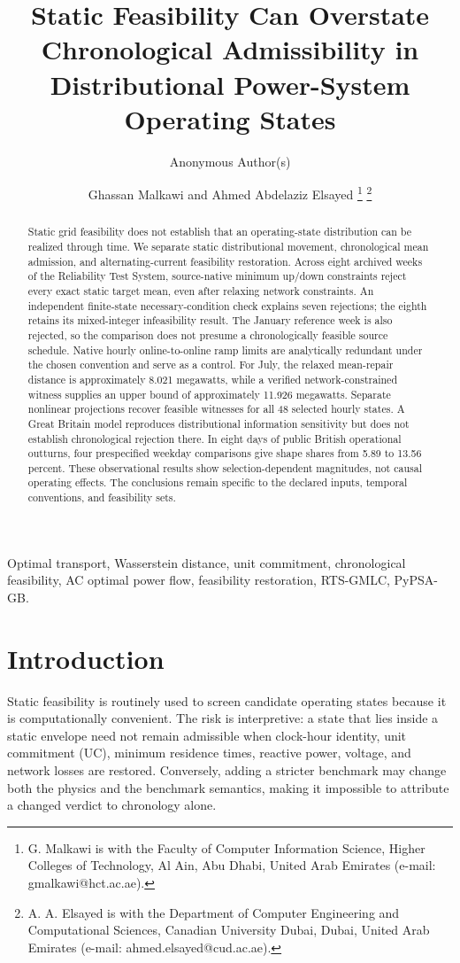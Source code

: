 \documentclass[journal]{IEEEtran}
\title{Static Feasibility Can Overstate Chronological Admissibility in Distributional Power-System Operating States}
\author{Anonymous Author(s)}
\author{Ghassan Malkawi and Ahmed Abdelaziz Elsayed%
\thanks{G. Malkawi is with the Faculty of Computer Information Science, Higher Colleges of Technology, Al Ain, Abu Dhabi, United Arab Emirates (e-mail: gmalkawi@hct.ac.ae).}%
\thanks{A. A. Elsayed is with the Department of Computer Engineering and Computational Sciences, Canadian University Dubai, Dubai, United Arab Emirates (e-mail: ahmed.elsayed@cud.ac.ae).}%
}
\begin{document}
\maketitle

\begin{abstract}
Static grid feasibility does not establish that an operating-state distribution can be realized through time. We separate static distributional movement, chronological mean admission, and alternating-current feasibility restoration. Across eight archived weeks of the Reliability Test System, source-native minimum up/down constraints reject every exact static target mean, even after relaxing network constraints. An independent finite-state necessary-condition check explains seven rejections; the eighth retains its mixed-integer infeasibility result. The January reference week is also rejected, so the comparison does not presume a chronologically feasible source schedule. Native hourly online-to-online ramp limits are analytically redundant under the chosen convention and serve as a control. For July, the relaxed mean-repair distance is approximately 8.021 megawatts, while a verified network-constrained witness supplies an upper bound of approximately 11.926 megawatts. Separate nonlinear projections recover feasible witnesses for all 48 selected hourly states. A Great Britain model reproduces distributional information sensitivity but does not establish chronological rejection there. In eight days of public British operational outturns, four prespecified weekday comparisons give shape shares from 5.89 to 13.56 percent. These observational results show selection-dependent magnitudes, not causal operating effects. The conclusions remain specific to the declared inputs, temporal conventions, and feasibility sets.
\end{abstract}

\begin{IEEEkeywords}
Optimal transport, Wasserstein distance, unit commitment, chronological feasibility, AC optimal power flow, feasibility restoration, RTS-GMLC, PyPSA-GB.
\end{IEEEkeywords}

\section{Introduction}
Static feasibility is routinely used to screen candidate operating states because it is computationally convenient. The risk is interpretive: a state that lies inside a static envelope need not remain admissible when clock-hour identity, unit commitment (UC), minimum residence times, reactive power, voltage, and network losses are restored. Conversely, adding a stricter benchmark may change both the physics and the benchmark semantics, making it impossible to attribute a changed verdict to chronology alone.
\end{document}
